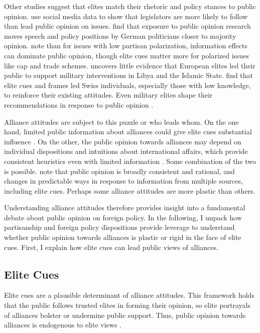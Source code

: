 \documentclass[12pt]{article}
\begin{document}
Other studies suggest that elites match their rhetoric and policy stances to public opinion. 
\citet{Barberaetal2019} use social media data to show that legislators are more likely to follow than lead public opinion on issues. 
\citet{HagerHilbig2020} find that exposure to public opinion research moves speech and policy positions by German politicians closer to majority opinion. 
\citet{GuisingerSaunders2017} note than for issues with low partisan polarization, information effects can dominate public opinion, though elite cues matter more for polarized issues like cap and trade schemes. 
\citet{Haesebrouck2019} uncovers little evidence that European elites led their public to support military interventions in Libya and the Islamic State. 
\citet{Bechteletal2015} find that elite cues and frames led Swiss individuals, especially those with low knowledge, to reinforce their existing attitudes. 
Even military elites shape their recommendations in response to public opinion \citep{LinGreenberg2021}. 



Alliance attitudes are subject to this puzzle or who leads whom. 
On the one hand, limited public information about alliances could give elite cues substantial influence \citep{Druckman2001}. 
On the other, the public opinion towards alliances may depend on individual dispositions and intuitions about international affairs, which provide consistent heuristics even with limited information \citep{Herrmannetal2009, KertzerZeitzoff2017}.
Some combination of the two is possible. 
\citet{PageShapiro1992} note that public opinion is broadly consistent and rational, and changes in predictable ways in response to information from multiple sources, including elite cues. 
Perhaps some alliance attitudes are more plastic than others. 


Understanding alliance attitudes therefore provides insight into a fundamental debate about public opinion on foreign policy.  
In the following, I unpack how partisanship and foreign policy dispositions provide leverage to understand whether public opinion towards alliances is plastic or rigid in the face of elite cues.  
First, I explain how elite cues can lead public views of alliances. 


\subsection{Elite Cues} 

Elite cues are a plausible determinant of alliance attitudes. 
This framework holds that the public follows trusted elites in forming their opinion, so elite portrayals of alliances bolster or undermine public support.
Thus, public opinion towards alliances is endogenous to elite views \citep{Druckman2014}.
\end{document}
